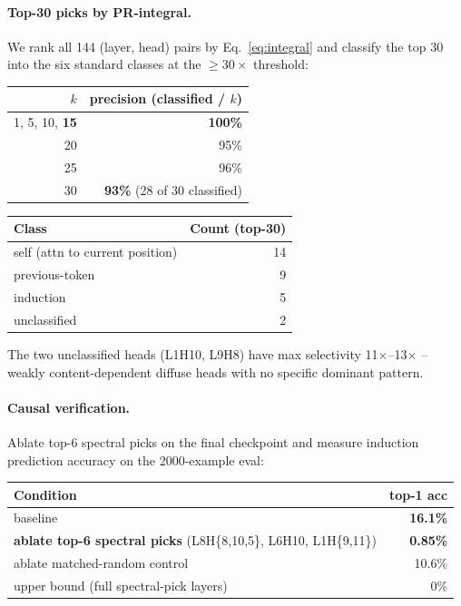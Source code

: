 \documentclass[11pt]{article}
\begin{document}
\paragraph{Top-30 picks by PR-integral.} We rank all 144 (layer, head) pairs by Eq.~\ref{eq:integral} and classify the top 30 into the six standard classes at the $\geq 30\times$ threshold:

\begin{center}
\small
\begin{tabular}{rr}
\toprule
$k$ & precision (classified / $k$) \\
\midrule
1, 5, 10, \textbf{15} & \textbf{100\%} \\
20 & 95\% \\
25 & 96\% \\
30 & \textbf{93\%} (28 of 30 classified) \\
\bottomrule
\end{tabular}
\quad
\begin{tabular}{lr}
\toprule
Class & Count (top-30) \\
\midrule
self (attn to current position) & 14 \\
previous-token & 9 \\
induction & 5 \\
unclassified & 2 \\
\bottomrule
\end{tabular}
\end{center}

The two unclassified heads (L1H10, L9H8) have max selectivity 11$\times$--13$\times$ -- weakly content-dependent diffuse heads with no specific dominant pattern.

\paragraph{Causal verification.} Ablate top-6 spectral picks on the final checkpoint and measure induction prediction accuracy on the 2000-example eval:

\begin{center}
\small
\begin{tabular}{lr}
\toprule
Condition & top-1 acc \\
\midrule
baseline & \textbf{16.1\%} \\
\textbf{ablate top-6 spectral picks} (L8H\{8,10,5\}, L6H10, L1H\{9,11\}) & \textbf{0.85\%} \\
ablate matched-random control & 10.6\% \\
upper bound (full spectral-pick layers) & 0\% \\
\bottomrule
\end{tabular}
\end{center}
\end{document}
